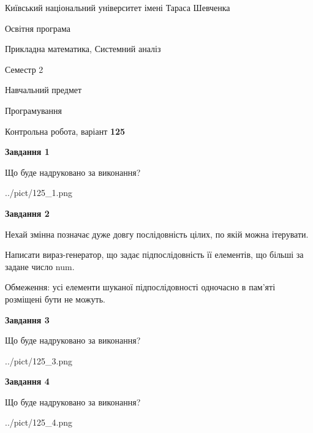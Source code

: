 \documentclass[12pt, ukrainian]{article}
\begin{document}
{{\begin {small}\par
{ \center  Київський національний університет імені Тараса Шевченка \par}
{\parbox {5 cm}{Освітня програма \hfill}{\parbox {8 cm}{Прикладна математика, Системний аналіз \hfill}}\parbox {5 cm}{\hfill Семестр 2}}\par
{\parbox {5 cm} {Навчальний предмет \hfill}\parbox {7 cm}{Програмування \hfill}\parbox {6cm}{\hfill}\par}\vspace{-7pt} \end{small}}{\center Контрольна робота, варіант  \No \textbf
{ 125 }\par}}
{
\begin {large}
{\begin {center}\textbf{Завдання 1}\end {center}}\par
Що буде надруковано за виконання?\par\par
\begin{center}
	{../pict/125_1.png}
\end{center}
\newpage

{\begin {center}\textbf{Завдання 2}\end {center}}\par
Нехай змінна  позначає дуже довгу послідовність цілих, по якій можна ітерувати.

Написати вираз-генератор, що задає підпослідовність її елементів, що більші за задане число num.

Обмеження: усі елементи шуканої підпослідовності одночасно в пам'яті розміщені бути не можуть.\par
\newpage

{\begin {center}\textbf{Завдання 3}\end {center}}\par
Що буде надруковано за виконання?
\begin{center}
	{../pict/125_3.png}
\end{center}
\newpage

{\begin {center}\textbf{Завдання 4}\end {center}}\par
Що буде надруковано за виконання?\par
\begin{center}
	{../pict/125_4.png}
\end{center}
\newpage


\end{large}}
\end{document}
